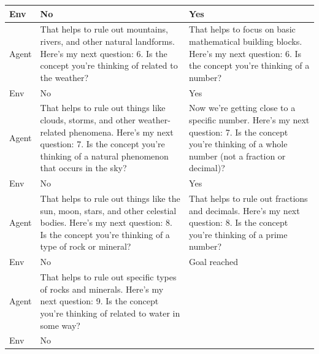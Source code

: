 \documentclass{article}
\theoremstyle{plain}
\theoremstyle{definition}
\theoremstyle{remark}
\begin{document}
\begin{table}[h]
{\begin{tabular}{|p{1cm} | p{7cm} | p{7cm}|}
        \hline
        Env & No & Yes \\
        \hline
        Agent & That helps to rule out mountains, rivers, and other natural landforms. Here's my next question: 6. Is the concept you're thinking of related to the weather? & That helps to focus on basic mathematical building blocks. Here's my next question: 6. Is the concept you're thinking of a number? \\
        \hline
        Env & No & Yes \\
        \hline
        Agent & That helps to rule out things like clouds, storms, and other weather-related phenomena. Here's my next question: 7. Is the concept you're thinking of a natural phenomenon that occurs in the sky? & Now we're getting close to a specific number. Here's my next question: 7. Is the concept you're thinking of a whole number (not a fraction or decimal)? \\
        \hline
        Env & No & Yes \\
        \hline
        Agent & That helps to rule out things like the sun, moon, stars, and other celestial bodies. Here's my next question: 8. Is the concept you're thinking of a type of rock or mineral? & That helps to rule out fractions and decimals. Here's my next question: 8. Is the concept you're thinking of a prime number? \\
        \hline
        Env & No & Goal reached \\
        \hline
        Agent & That helps to rule out specific types of rocks and minerals. Here's my next question: 9. Is the concept you're thinking of related to water in some way? & \\
        \hline
        Env & No & \\
        \bottomrule
        \end{tabular}
    }
    \vspace{-0.3cm}
\end{table}
\newpage
\end{document}
